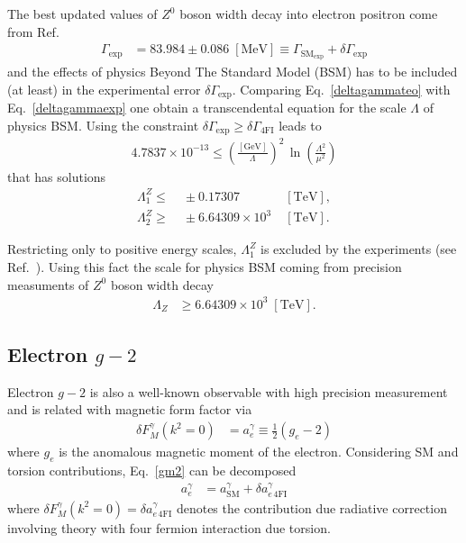 The best updated values of $Z^0$ boson width decay into electron positron come from Ref.~\cite{Beringer:1900zz}
\begin{align}
\label{deltagammaexp}
 \Gamma_{\text{exp}} &= 83.984 \pm 0.086\;[\text{MeV}] \equiv \Gamma_{\text{SM}_\text{exp}} + \delta\Gamma_{\text{exp}}
\end{align}
and the effects of physics Beyond The Standard Model (BSM) has to be included (at least) in the experimental error $\delta\Gamma_{\text{exp}}$. Comparing Eq.~\eqref{deltagammateo} with Eq.~\eqref{deltagammaexp} one obtain a transcendental equation for the scale $\Lambda$ of physics BSM. Using the constraint $\delta\Gamma_{\text{exp}} \geq \delta\Gamma_{\text{4FI}}$ leads to
\begin{align}
4.7837\times10^{-13}\leq\left(\frac{[\text{GeV}]}{\Lambda}\right)^2\,\ln\left(\frac{\Lambda^2}{\mu^2}\right)
\end{align}
that has solutions
\begin{eqnarray}
 \label{lowscalefromz}
 \Lambda_1^{Z} \leq&\; \pm0.17307\;&[\text{TeV}], \\
 \label{upscalefromz}
 \Lambda_2^{Z} \geq&\; \pm6.64309\times10^3\;&[\text{TeV}].
\end{eqnarray}

Restricting only to positive energy scales, $\Lambda_1^Z$ is excluded by the experiments (see Ref.~\cite{Chatrchyan:2013muj}). Using this fact the scale for physics BSM coming from precision measuments of $Z^0$ boson width decay
\begin{align}
 \Lambda_Z &\geq 6.64309\times10^3\;[\text{TeV}].
\end{align}



\subsection{Electron $g-2$}

Electron $g-2$ is also a well-known observable with high precision measurement and is related with magnetic form factor via
\begin{align}
\label{gm2}
\delta F_M^\gamma(k^2=0) &= a_e^\gamma \equiv \frac{1}{2}\left(g_e-2\right)
\end{align}
where $g_e$ is the anomalous magnetic moment of the electron. Considering SM and torsion contributions, Eq.~\eqref{gm2} can be decomposed
\begin{align}
a_e^\gamma &= a_{\text{SM}}^\gamma + \delta a_{e\,\text{4FI}}^\gamma
\end{align}
where $\delta F_M^\gamma(k^2=0) = \delta a_{e\,\text{4FI}}^\gamma$ denotes the contribution due radiative correction involving theory with four fermion interaction due torsion. 

